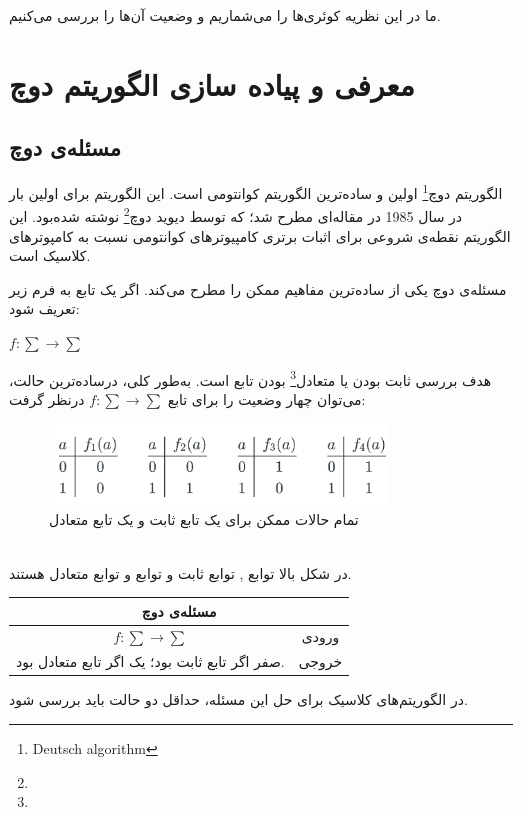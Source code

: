 \documentclass{book}
\begin{document}
ما در این نظریه کوئری‌ها را می‌شماریم و وضعیت آن‌‌ها را بررسی می‌کنیم.

\section{معرفی و پیاده سازی الگوریتم دوچ}

\subsection{مسئله‌ی دوچ}
الگوریتم دوچ\footnote{Deutsch algorithm} اولین و ساده‌ترین الگوریتم کوانتومی‌ است. این الگوریتم برای اولین بار در سال 1985 در مقاله‌ای مطرح شد؛ که توسط دیوید دوچ\footnote{} نوشته شده‌‌بود. این الگوریتم نقطه‌ی شروعی برای اثبات برتری کامپیوترهای کوانتومی نسبت به کامپوترهای کلاسیک است.

مسئله‌ی دوچ یکی از ساده‌ترین مفاهیم ممکن را مطرح می‌کند. اگر یک تابع به فرم زیر تعریف شود: 
\begin{center}
	$f : \sum \rightarrow \sum$
\end{center}
هدف بررسی ثابت بودن یا متعادل\footnote{} بودن تابع  است. 
به‌طور کلی، درساده‌ترین حالت، می‌توان چهار وضعیت را برای تابع $f : \sum \rightarrow \sum$ درنظر گرفت:\\
\begin{figure}[ht]
	\centering
	\includegraphics[width=0.8\textwidth]{Constantorbalanse.png}
	\caption{تمام حالات ممکن برای یک تابع ثابت و یک تابع متعادل}
\end{figure}\\
در شکل بالا توابع  ,  توابع ثابت و توابع  و  توابع متعادل هستند.
\begin{center}
\begin{tabular}{|c|c|}
	\hline
	\multicolumn{2}{|c|}{مسئله‌ی دوچ} \\
	\hline
	$f : \sum \rightarrow \sum$ & ورودی \\
	\hline
	صفر اگر تابع ثابت بود؛ یک اگر تابع متعادل بود.  & خروجی \\
	\hline
\end{tabular}
\end{center}
در الگوریتم‌های کلاسیک برای حل این مسئله، حداقل دو حالت باید بررسی شود.
\end{document}
